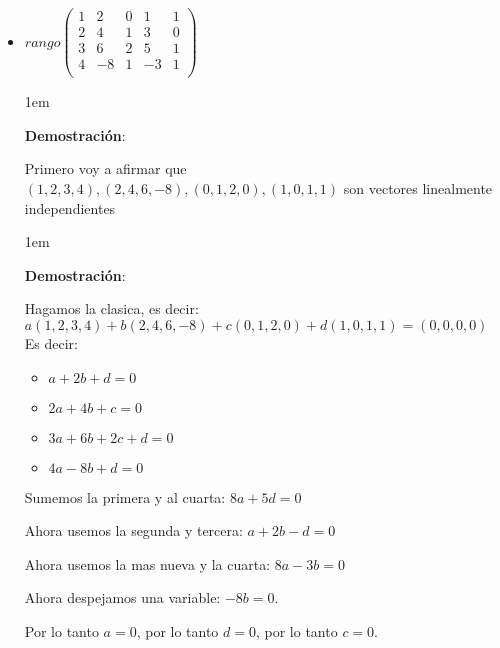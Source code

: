 \documentclass[12pt, fleqn]{article}                             %
\newenvironment{SmallIndentation}[1][0.75em]                    %
        {\begin{adjustwidth}{#1}{}\begin{footnotesize}}             %
        {\end{footnotesize}\end{adjustwidth}}                       %
\theoremstyle{break}                                            %
\newcommand{\pVector}[1]                                        %
        { \ensuremath{\begin{pmatrix}#1\end{pmatrix}} }             %
\begin{document}
    \begin{itemize}
        
        \item 
            $rango\pVector{
                1 & 2  & 0 & 1  & 1 \\
                2 & 4  & 1 & 3  & 0 \\
                3 & 6  & 2 & 5  & 1 \\
                4 & -8 & 1 & -3 & 1 \\
                }$

            \begin{SmallIndentation}[1em]
                \textbf{Demostración}:
                
                Primero voy a afirmar que $(1, 2, 3, 4), (2, 4, 6, -8), (0, 1, 2, 0), (1, 0, 1, 1)$
                son vectores linealmente independientes

                \begin{SmallIndentation}[1em]
                    \textbf{Demostración}:
                    
                    Hagamos la clasica, es decir:
                    $a(1, 2, 3, 4) + b(2, 4, 6, -8) + c(0, 1, 2, 0) + d(1, 0, 1, 1) = (0, 0, 0, 0)$
                    Es decir:
                    \begin{itemize}
                        \item $a + 2b + d = 0$
                        \item $2a + 4b + c = 0$
                        \item $3a + 6b + 2c + d = 0$
                        \item $4a - 8b + d = 0$
                    \end{itemize}

                    Sumemos la primera y al cuarta:
                    $8a + 5d = 0$

                    Ahora usemos la segunda y tercera:
                    $a + 2b - d = 0$

                    Ahora usemos la mas nueva y la cuarta:
                    $8a -3b = 0$

                    Ahora despejamos una variable:
                    $-8b = 0$.

                    Por lo tanto $a = 0$, por lo tanto $d = 0$, por lo tanto $c = 0$.

                \end{SmallIndentation}


\end{SmallIndentation}
\end{itemize}
\end{document}
